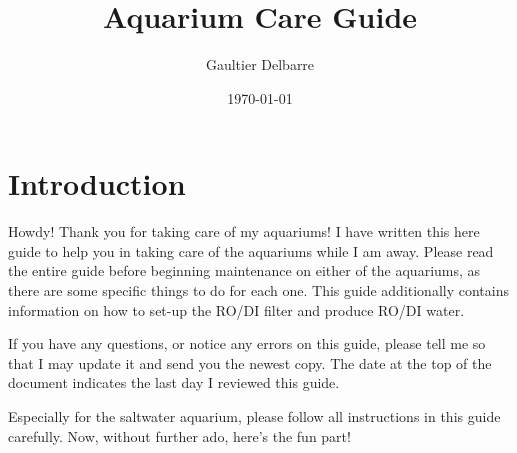 \documentclass{report}
\title{Aquarium Care Guide}
\author{Gaultier Delbarre}
\date{\today}
\begin{document}
\maketitle

\tableofcontents

\newpage
\chapter{Introduction}
Howdy! Thank you for taking care of my aquariums! I have written this here guide to help you in taking care of the aquariums 
while I am away. Please read the entire guide before beginning maintenance on either of the aquariums, as there are some 
specific things to do for each one. This guide additionally contains information on how to set-up the RO/DI filter and 
produce RO/DI water. 

If you have any questions, or notice any errors on this guide, please tell me so that I may update it and send you the newest 
copy. The date at the top of the document indicates the last day I reviewed this guide. 

Especially for the saltwater aquarium, please follow all instructions in this guide carefully. Now, without further ado, 
here's the fun part!
\end{document}
